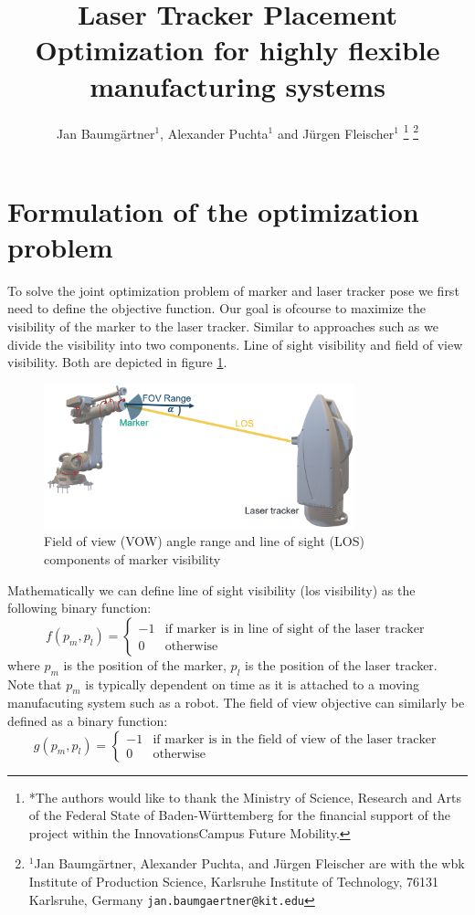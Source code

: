 \documentclass{svproc}
\title{\LARGE \bf
Laser Tracker Placement Optimization for highly flexible manufacturing systems
}
\author{Jan Baumgärtner$^{1}$,  Alexander Puchta$^{1}$ and Jürgen Fleischer$^{1}$%
\thanks{*The authors would like to thank the Ministry of Science, Research and Arts of the Federal State of Baden-Württemberg for the financial support of the project within the InnovationsCampus Future Mobility.
}%
\thanks{$^{1}$Jan Baumgärtner, Alexander Puchta, and Jürgen Fleischer are with the wbk Institute of Production Science,
        Karlsruhe Institute of Technology, 76131 Karlsruhe, Germany
        {\tt\small jan.baumgaertner@kit.edu}}%
}
\begin{document}
\maketitle
\thispagestyle{empty}
\pagestyle{empty}


\section{Formulation of the optimization problem}
To solve the joint optimization problem of marker and laser tracker pose we first need to define the objective function.
Our goal is ofcourse to maximize the visibility of the marker to the laser tracker.
Similar to approaches such as \cite{ieee_sensors} we divide the visibility into two components.
Line of sight visibility and field of view visibility.
Both  are depicted in figure \ref{fig:visibility}.
\begin{figure}
        \centering
        \includegraphics[width=0.8\textwidth]{figures/visibility.png}
        \caption{Field of view (VOW) angle range and line of sight (LOS) components of marker visibility}
        \label{fig:visibility}
\end{figure}
Mathematically we can define line of sight visibility (los visibility) as the following binary function:
\begin{equation}
    f(p_m,p_l) = \begin{cases}
    -1 & \text{if } \text{marker is in line of sight of the laser tracker} \\
    0 & \text{otherwise}
    \end{cases}
\end{equation}
where $p_m$ is the position of the marker, $p_l$ is the position of the laser tracker.
Note that $p_m$ is typically dependent on time as it is attached to a moving manufacuting system such as a robot.
The field of view objective can similarly be defined as a binary function:
\begin{equation}
    g(p_m,p_l) = \begin{cases}
    -1 & \text{if } \text{marker is in the field of view of the laser tracker} \\
    0 & \text{otherwise}
    \end{cases}
\end{equation}
\end{document}
